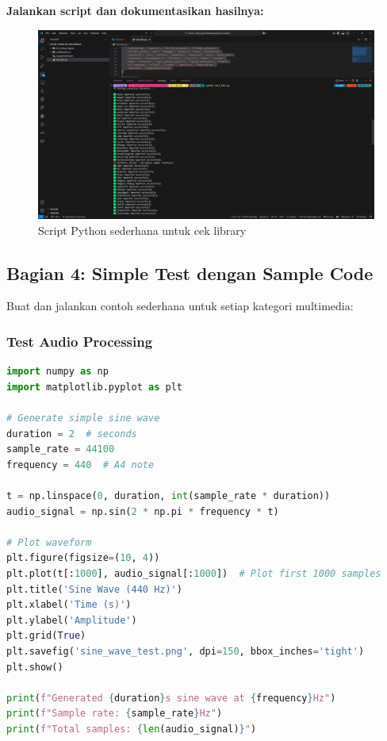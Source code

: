 \documentclass[11pt,a4paper]{article}
\begin{document}
\textbf{Jalankan script dan dokumentasikan hasilnya:}
\begin{figure}[H]
    \centering
    \includegraphics[scale = 0.25]{Figure/img6.png}
    \caption{Script Python sederhana untuk cek library}
    \vspace{0.1cm}
    
\end{figure}

\subsection{Bagian 4: Simple Test dengan Sample Code}
Buat dan jalankan contoh sederhana untuk setiap kategori multimedia:

\subsubsection{Test Audio Processing}
\begin{lstlisting}[language=Python, caption=Test audio processing sederhana]
import numpy as np
import matplotlib.pyplot as plt

# Generate simple sine wave
duration = 2  # seconds
sample_rate = 44100
frequency = 440  # A4 note

t = np.linspace(0, duration, int(sample_rate * duration))
audio_signal = np.sin(2 * np.pi * frequency * t)

# Plot waveform
plt.figure(figsize=(10, 4))
plt.plot(t[:1000], audio_signal[:1000])  # Plot first 1000 samples
plt.title('Sine Wave (440 Hz)')
plt.xlabel('Time (s)')
plt.ylabel('Amplitude')
plt.grid(True)
plt.savefig('sine_wave_test.png', dpi=150, bbox_inches='tight')
plt.show()

print(f"Generated {duration}s sine wave at {frequency}Hz")
print(f"Sample rate: {sample_rate}Hz")
print(f"Total samples: {len(audio_signal)}")
\end{lstlisting}
\end{document}
